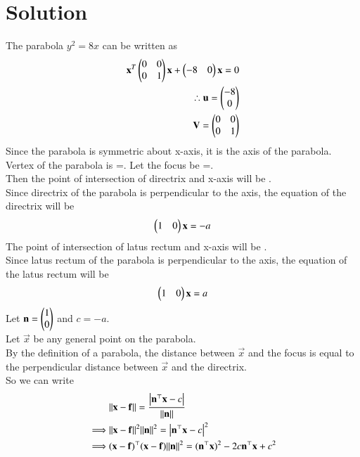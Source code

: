 \documentclass[journal,12pt,twocolumn]{IEEEtran}
\begin{document}
\section*{Solution}
The parabola $y^2=8x$ can be written as\\
\begin{align}
    {\mathbf{x}}^T\begin{pmatrix}0&0\\0&1\end{pmatrix}\mathbf{x}+\begin{pmatrix}-8&0\end{pmatrix}\mathbf{x}=0\\
    \therefore \mathbf{u}=\begin{pmatrix}-8\\0\end{pmatrix}\\
    \mathbf{V}=\begin{pmatrix}0&0\\0&1\end{pmatrix}
\end{align}
Since the parabola is symmetric about x-axis, it is the axis of the parabola.\\
Vertex of the parabola is =.
Let the focus be =.\\
Then the point of intersection of directrix and x-axis will be .\\
Since directrix of the parabola is perpendicular to the axis, the equation of the directrix will be\\
\begin{align}
    \begin{pmatrix}1&0\end{pmatrix}\mathbf{x}=-a
\end{align}
The point of intersection of latus rectum and x-axis will be .\\
Since latus rectum of the parabola is perpendicular to the axis, the equation of the latus rectum will be\\
\begin{align}
    \begin{pmatrix}1&0\end{pmatrix}\mathbf{x}=a
\end{align}
Let $\mathbf{n}=\begin{pmatrix}1\\0\end{pmatrix}$ and $c=-a$.\\
Let $\vec{x}$ be any general point on the parabola.\\ 
By the definition of a parabola, the distance between $\vec{x}$ and the focus is equal to the perpendicular distance between $\vec{x}$ and the directrix.\\
So we can write
\begin{align}
    &\lVert\mathbf{x}-\mathbf{f}\rVert=\dfrac{\left|\mathbf{n}^\top\mathbf{x}-c\right|}{\lVert\mathbf{n}\rVert}\\
    \implies &\lVert\mathbf{x}-\mathbf{f}\rVert^2\lVert\mathbf{n}\rVert^2=\left|\mathbf{n}^\top\mathbf{x}-c\right|^2\\
    \implies &(\mathbf{x}-\mathbf{f})^\top(\mathbf{x}-\mathbf{f})\lVert\mathbf{n}\rVert^2=(\mathbf{n}^\top\mathbf{x})^2-2c\mathbf{n}^\top\mathbf{x}+c^2
\end{align}
\end{document}
